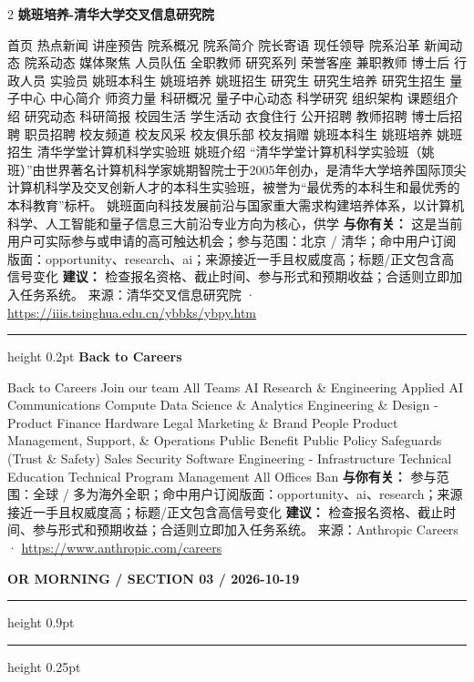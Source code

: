 \documentclass[10.5pt]{ctexart}
\begin{document}
\begin{multicols}{2}
{\large\bfseries 姚班培养-清华大学交叉信息研究院}\par
首页 热点新闻 讲座预告 院系概况 院系简介 院长寄语 现任领导 院系沿革 新闻动态 院系动态 媒体聚焦 人员队伍 全职教师 研究系列 荣誉客座 兼职教师 博士后 行政人员 实验员 姚班本科生 姚班培养 姚班招生 研究生 研究生培养 研究生招生 量子中心 中心简介 师资力量 科研概况 量子中心动态 科学研究 组织架构 课题组介绍 研究动态 科研简报 校园生活 学生活动 衣食住行 公开招聘 教师招聘 博士后招聘 职员招聘 校友频道 校友风采 校友俱乐部 校友捐赠 姚班本科生 姚班培养 姚班招生 清华学堂计算机科学实验班 姚班介绍 “清华学堂计算机科学实验班（姚班）”由世界著名计算机科学家姚期智院士于2005年创办，是清华大学培养国际顶尖计算机科学及交叉创新人才的本科生实验班，被誉为“最优秀的本科生和最优秀的本科教育”标杆。 姚班面向科技发展前沿与国家重大需求构建培养体系，以计算机科学、人工智能和量子信息三大前沿专业方向为核心，供学
\textbf{与你有关：} 这是当前用户可实际参与或申请的高可触达机会；参与范围：北京 / 清华；命中用户订阅版面：opportunity、research、ai；来源接近一手且权威度高；标题/正文包含高信号变化
\textbf{建议：} 检查报名资格、截止时间、参与形式和预期收益；合适则立即加入任务系统。
{\footnotesize\color{ormuted} 来源：清华交叉信息研究院 · \url{https://iiis.tsinghua.edu.cn/ybbks/ybpy.htm}}
\vspace{2mm}
\hrule height 0.2pt
\vspace{2mm}
{\large\bfseries Back to Careers}\par
Back to Careers Join our team All Teams AI Research \& Engineering Applied AI Communications Compute Data Science \& Analytics Engineering \& Design - Product Finance Hardware Legal Marketing \& Brand People Product Management, Support, \& Operations Public Benefit Public Policy Safeguards (Trust \& Safety) Sales Security Software Engineering - Infrastructure Technical Education Technical Program Management All Offices Ban
\textbf{与你有关：} 参与范围：全球 / 多为海外全职；命中用户订阅版面：opportunity、ai、research；来源接近一手且权威度高；标题/正文包含高信号变化
\textbf{建议：} 检查报名资格、截止时间、参与形式和预期收益；合适则立即加入任务系统。
{\footnotesize\color{ormuted} 来源：Anthropic Careers · \url{https://www.anthropic.com/careers}}
\end{multicols}
\newpage
{\small\bfseries OR MORNING / SECTION 03 / 2026-10-19}
\vspace{2mm}
\hrule height 0.9pt
\vspace{1.5mm}
\hrule height 0.25pt
\vspace{4mm}
\end{document}
